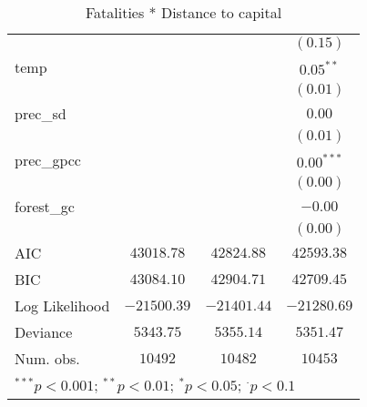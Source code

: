 \begin{sidewaystable}
\begin{center}
{\begin{tabular}{l c c c}
                     &               &               & $(0.15)$      \\
temp                 &               &               & $0.05^{**}$   \\
                     &               &               & $(0.01)$      \\
prec\_sd             &               &               & $0.00$        \\
                     &               &               & $(0.01)$      \\
prec\_gpcc           &               &               & $0.00^{***}$  \\
                     &               &               & $(0.00)$      \\
forest\_gc           &               &               & $-0.00$       \\
                     &               &               & $(0.00)$      \\
\hline
AIC                  & $43018.78$    & $42824.88$    & $42593.38$    \\
BIC                  & $43084.10$    & $42904.71$    & $42709.45$    \\
Log Likelihood       & $-21500.39$   & $-21401.44$   & $-21280.69$   \\
Deviance             & $5343.75$     & $5355.14$     & $5351.47$     \\
Num. obs.            & $10492$       & $10482$       & $10453$       \\
\hline
\multicolumn{4}{l}{\scriptsize{$^{***}p<0.001$; $^{**}p<0.01$; $^{*}p<0.05$; $^{\cdot}p<0.1$}}
\end{tabular}
}
\caption{Fatalities * Distance to capital}
\label{interaction_deaths}
\end{center}
\end{sidewaystable}
